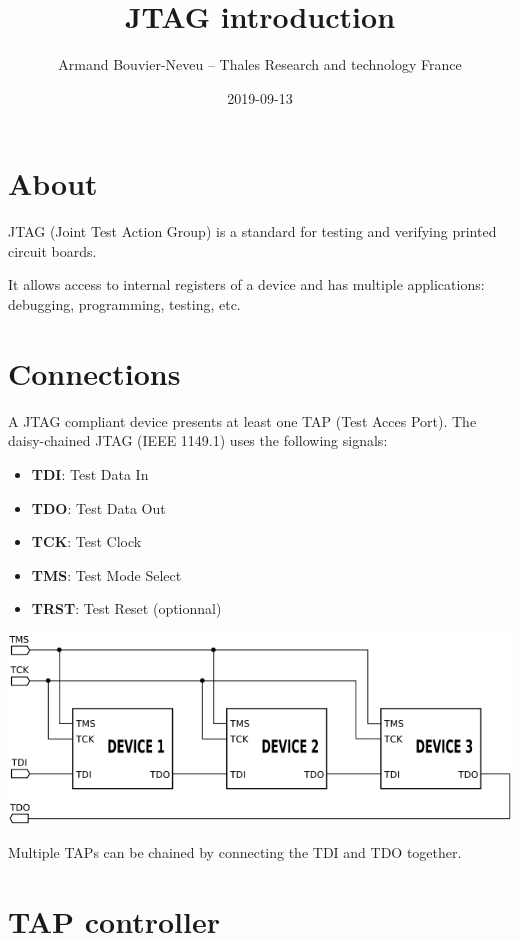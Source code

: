 \documentclass{article}
\title{JTAG introduction}
\date{2019-09-13}
\author{Armand Bouvier-Neveu -- Thales Research and technology France}
\begin{document}
	\maketitle
	
	\section{About}
	
	JTAG (Joint Test Action Group) is a standard for testing and verifying printed circuit boards.
	
	It allows access to internal registers of a device and has multiple applications: debugging, programming, testing, etc.
	
	\section{Connections}
	
	A JTAG compliant device presents at least one TAP (Test Acces Port). The daisy-chained JTAG (IEEE 1149.1) uses the following signals:
	
	\begin{itemize}
	\item \textbf{TDI}: Test Data In
	\item \textbf{TDO}: Test Data Out
	\item \textbf{TCK}: Test Clock
	\item \textbf{TMS}: Test Mode Select
	\item \textbf{TRST}: Test Reset (optionnal)
	\end{itemize}
	
	\begin{center}
	\includegraphics[scale=0.7]{Jtag_chain.png}
	\end{center}
	
	Multiple TAPs can be chained by connecting the TDI and TDO together.
	
	\section{TAP controller}
	
\end{document}
